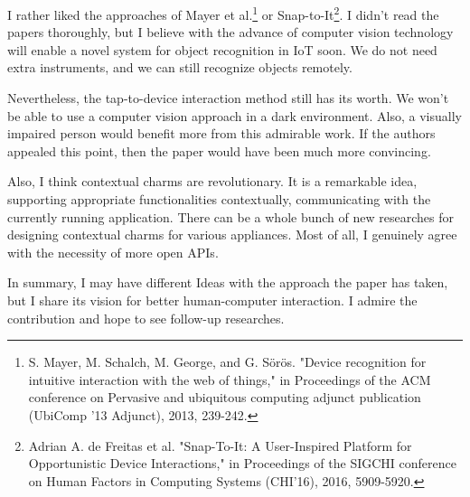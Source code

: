 \documentclass[10pt,a4paper]{article}
\begin{document}
	I rather liked the approaches of Mayer et al.\footnote{S. Mayer, M. Schalch, M. George, and	G. Sörös. "Device recognition for intuitive interaction with the web of things," in Proceedings of the ACM conference on Pervasive and ubiquitous computing adjunct publication (UbiComp '13 Adjunct), 2013, 239-242.} or Snap-to-It\footnote{Adrian A. de Freitas et al. "Snap-To-It: A User-Inspired Platform for Opportunistic Device Interactions," in Proceedings of the SIGCHI conference on Human Factors in Computing Systems (CHI’16), 2016, 5909-5920.}. I didn't read the papers thoroughly, but I believe with the advance of computer vision technology will enable a novel system for object recognition in IoT soon. We do not need extra instruments, and we can still recognize objects remotely.
	
	
	Nevertheless, the tap-to-device interaction method still has its worth. We won't be able to use a computer vision approach in a dark environment. Also, a visually impaired person would benefit more from this admirable work. If the authors appealed this point, then the paper would have been much more convincing.
	
	Also, I think contextual charms are revolutionary. It is a remarkable idea, supporting appropriate functionalities contextually, communicating with the currently running application. There can be a whole bunch of new researches for designing contextual charms for various appliances. Most of all, I genuinely agree with the necessity of more open APIs. 
	
	In summary, I may have different Ideas with the approach the paper has taken, but I share its vision for better human-computer interaction. I admire the contribution and hope to see follow-up researches.
\end{document}
